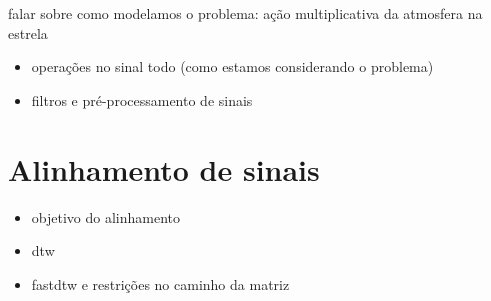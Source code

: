 falar sobre como modelamos o problema: ação multiplicativa da atmosfera na estrela 
\begin{itemize}
    \item operações no sinal todo (como estamos considerando o problema)
    \item filtros e pré-processamento de sinais
\end{itemize}


\section{Alinhamento de sinais}
\begin{itemize}
    \item objetivo do alinhamento 
    \item dtw
    \item fastdtw e restrições no caminho da matriz
\end{itemize}



